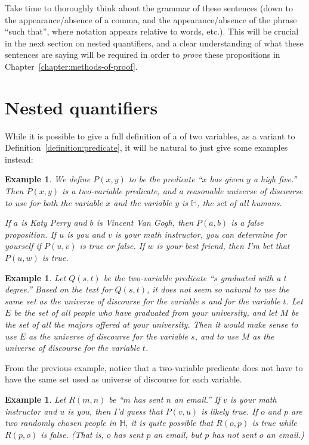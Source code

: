 \documentclass{book}
\newcounter{ekcounter}%
\theoremstyle{ekimcustom}
\newtheorem{example}[ekcounter]{Example}
\newcommand\defn[1]{{\color{blue}{\bf #1}}}
\begin{document}
Take time to thoroughly think about the grammar of these sentences (down to the appearance/absence of a comma, and the appearance/absence of the phrase ``such that'', where notation appears relative to words, etc.). This will be crucial in the next section on nested quantifiers, and a clear understanding of what these sentences are saying will be required in order to \emph{prove} these propositions in Chapter~\ref{chapter:methods-of-proof}.

\section{Nested quantifiers}\label{section:nested-quantifiers}

While it is possible to give a full definition of a \defn{predicate} of two variables, as a variant to Definition~\ref{definition:predicate}, it will be natural to just give some examples instead:
\begin{example}\label{example:high-five}
We define $P(x,y)$ to be the predicate ``$x$ has given $y$ a high five.'' Then $P(x,y)$ is a two-variable predicate, and a reasonable universe of discourse to use for both the variable $x$ and the variable $y$ is $\mathbb{H}$, the set of all humans.

If $a$ is Katy Perry and $b$ is Vincent Van Gogh, then $P(a,b)$ is a false proposition. If $u$ is you and $v$ is your math instructor, you can determine for yourself if $P(u,v)$ is true or false. If $w$ is your best friend, then I'm bet that $P(u,w)$ is true.
\end{example}
\begin{example}
Let $Q(s,t)$ be the two-variable predicate ``$s$ graduated with a $t$ degree.'' Based on the text for $Q(s,t)$, it does not seem so natural to use the same set as the universe of discourse for the variable $s$ and for the variable $t$. Let $E$ be the set of all people who have graduated from your university, and let $M$ be the set of all the majors offered at your university. Then it would make sense to use $E$ as the universe of discourse for the variable $s$, and to use $M$ as the universe of discourse for the variable $t$.
\end{example}
From the previous example, notice that a two-variable predicate does not have to have the same set used as universe of discourse for each variable.
\begin{example}
Let $R(m,n)$ be ``$m$ has sent $n$ an email.'' If $v$ is your math instructor and $u$ is you, then I'd guess that $P(v,u)$ is likely true. If $o$ and $p$ are two randomly chosen people in $\mathbb{H}$, it is quite possible that $R(o,p)$ is true while $R(p,o)$ is false. (That is, $o$ has sent $p$ an email, but $p$ has not sent $o$ an email.)
\end{example}
\end{document}
